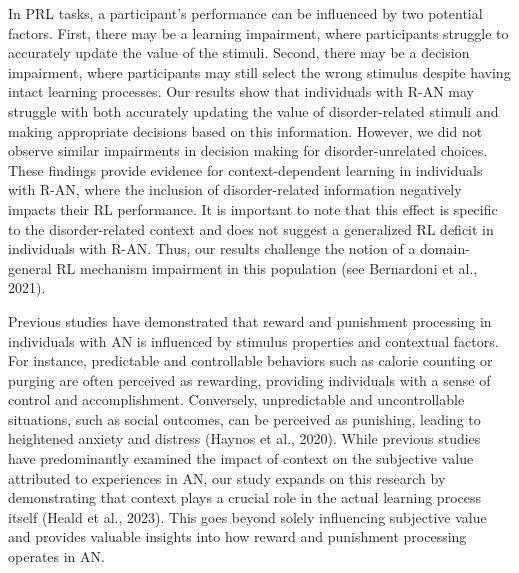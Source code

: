 \documentclass[
  man,floatsintext]{apa6}
\begin{document}
In PRL tasks, a participant's performance can be influenced by two potential factors. First, there may be a learning impairment, where participants struggle to accurately update the value of the stimuli. Second, there may be a decision impairment, where participants may still select the wrong stimulus despite having intact learning processes. Our results show that individuals with R-AN may struggle with both accurately updating the value of disorder-related stimuli and making appropriate decisions based on this information. However, we did not observe similar impairments in decision making for disorder-unrelated choices. These findings provide evidence for context-dependent learning in individuals with R-AN, where the inclusion of disorder-related information negatively impacts their RL performance. It is important to note that this effect is specific to the disorder-related context and does not suggest a generalized RL deficit in individuals with R-AN. Thus, our results challenge the notion of a domain-general RL mechanism impairment in this population (see Bernardoni et al., 2021).

Previous studies have demonstrated that reward and punishment processing in individuals with AN is influenced by stimulus properties and contextual factors. For instance, predictable and controllable behaviors such as calorie counting or purging are often perceived as rewarding, providing individuals with a sense of control and accomplishment. Conversely, unpredictable and uncontrollable situations, such as social outcomes, can be perceived as punishing, leading to heightened anxiety and distress (Haynos et al., 2020). While previous studies have predominantly examined the impact of context on the subjective value attributed to experiences in AN, our study expands on this research by demonstrating that context plays a crucial role in the actual learning process itself (Heald et al., 2023). This goes beyond solely influencing subjective value and provides valuable insights into how reward and punishment processing operates in AN.
\end{document}
